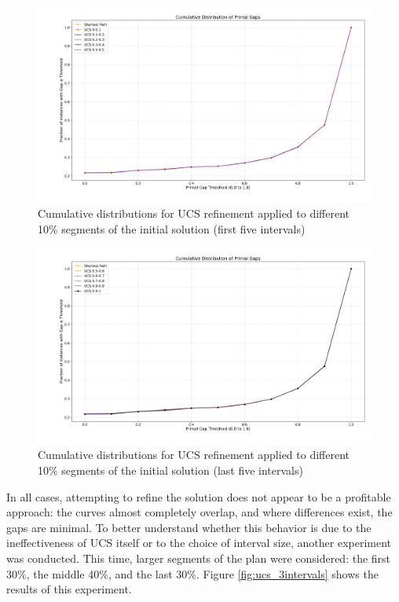 \begin{figure}[ht]
	\centering
	\includegraphics[width=\textwidth]{images/ucs_first5_intervals.png}
	\caption{Cumulative distributions for UCS refinement applied to different 10\% segments of the initial solution (first five intervals)}
	\label{fig:ucs_first5}
\end{figure}

\begin{figure}[ht]
	\centering
	\includegraphics[width=\textwidth]{images/ucs_last5_intervals.png}
	\caption{Cumulative distributions for UCS refinement applied to different 10\% segments of the initial solution (last five intervals)}
	\label{fig:ucs_last5}
\end{figure}

In all cases, attempting to refine the solution does not appear to be a profitable approach: the curves almost completely overlap, and
where differences exist, the gaps are minimal. To better understand whether this behavior is due to the ineffectiveness of \textsc{UCS} itself or
to the choice of interval size, another experiment was conducted. This time, larger segments of the plan were considered: the first 30\%,
the middle 40\%, and the last 30\%.
Figure \ref{fig:ucs_3intervals} shows the results of this experiment.


